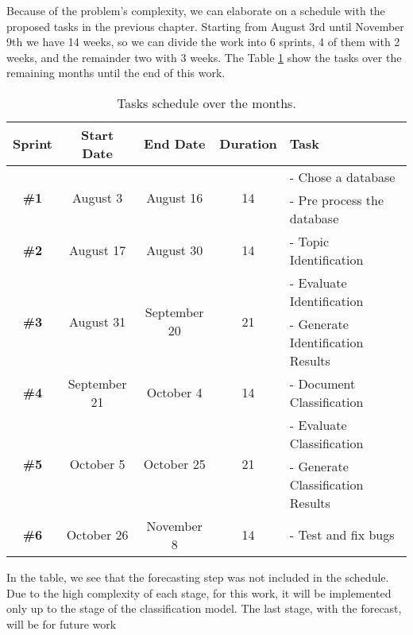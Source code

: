 Because of the problem's complexity, we can elaborate on a schedule with the proposed tasks in the previous chapter. Starting from August 3rd until November 9th we have 14 weeks, so we can divide the work into 6 sprints, 4 of them with 2 weeks, and the remainder two with 3 weeks. The Table \ref{tab:roadmap-table} show the tasks over the remaining months until the end of this work.

\begin{table}[h!]
	\centering
	\caption{Tasks schedule over the months.}
	\label{tab:roadmap-table}
	\begin{tabular}{c|cccl}
		\hline
		       \textbf{Sprint}        &    \textbf{Start Date}     &       \textbf{End Date}       &  \textbf{Duration}  & \textbf{Task}                     \\ \hline
		\multirow{2}{*}{\textbf{\#1}} & \multirow{2}{*}{August 3}  &  \multirow{2}{*}{August 16}   & \multirow{2}{*}{14} & - Chose a database                \\
		                              &                            &                               &                     & - Pre process the database        \\ \hline
		        \textbf{\#2}          &         August 17          &           August 30           &         14          & - Topic Identification            \\ \hline
		\multirow{2}{*}{\textbf{\#3}} & \multirow{2}{*}{August 31} & \multirow{2}{*}{September 20} & \multirow{2}{*}{21} & - Evaluate Identification         \\
		                              &                            &                               &                     & - Generate Identification Results \\ \hline
		        \textbf{\#4}          &        September 21        &           October 4           &         14          & - Document Classification         \\ \hline
		\multirow{2}{*}{\textbf{\#5}} & \multirow{2}{*}{October 5} &  \multirow{2}{*}{October 25}  & \multirow{2}{*}{21} & - Evaluate Classification         \\ 
		                              &                            &                               &                     & - Generate Classification Results \\ \hline
		        \textbf{\#6}          &         October 26         &          November 8           &         14          & - Test and fix bugs               \\ \hline
	\end{tabular}
\end{table}

In the table, we see that the forecasting step was not included in the schedule. Due to the high complexity of each stage, for this work, it will be implemented only up to the stage of the classification model. The last stage, with the forecast, will be for future work
